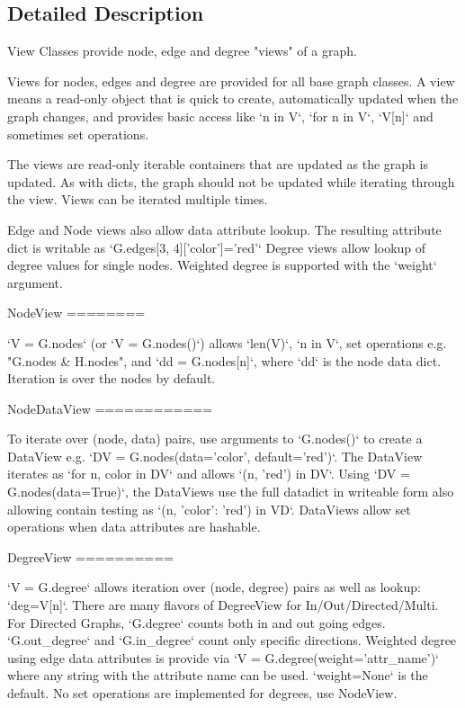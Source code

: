 \subsection{Detailed Description}
\begin{DoxyVerb}View Classes provide node, edge and degree "views" of a graph.

Views for nodes, edges and degree are provided for all base graph classes.
A view means a read-only object that is quick to create, automatically
updated when the graph changes, and provides basic access like `n in V`,
`for n in V`, `V[n]` and sometimes set operations.

The views are read-only iterable containers that are updated as the
graph is updated. As with dicts, the graph should not be updated
while iterating through the view. Views can be iterated multiple times.

Edge and Node views also allow data attribute lookup.
The resulting attribute dict is writable as `G.edges[3, 4]['color']='red'`
Degree views allow lookup of degree values for single nodes.
Weighted degree is supported with the `weight` argument.

NodeView
========

    `V = G.nodes` (or `V = G.nodes()`) allows `len(V)`, `n in V`, set
    operations e.g. "G.nodes & H.nodes", and `dd = G.nodes[n]`, where
    `dd` is the node data dict. Iteration is over the nodes by default.

NodeDataView
============

    To iterate over (node, data) pairs, use arguments to `G.nodes()`
    to create a DataView e.g. `DV = G.nodes(data='color', default='red')`.
    The DataView iterates as `for n, color in DV` and allows
    `(n, 'red') in DV`. Using `DV = G.nodes(data=True)`, the DataViews
    use the full datadict in writeable form also allowing contain testing as
    `(n, {'color': 'red'}) in VD`. DataViews allow set operations when
    data attributes are hashable.

DegreeView
==========

    `V = G.degree` allows iteration over (node, degree) pairs as well
    as lookup: `deg=V[n]`. There are many flavors of DegreeView
    for In/Out/Directed/Multi. For Directed Graphs, `G.degree`
    counts both in and out going edges. `G.out_degree` and
    `G.in_degree` count only specific directions.
    Weighted degree using edge data attributes is provide via
    `V = G.degree(weight='attr_name')` where any string with the
    attribute name can be used. `weight=None` is the default.
    No set operations are implemented for degrees, use NodeView.


\end{DoxyVerb}
